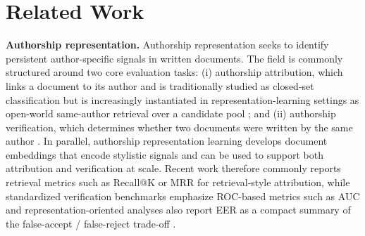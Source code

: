 \documentclass{article}
\newcommand{\rev}[1]{#1}
\begin{document}
\section{Related Work}
\label{sec:related-work}
\textbf{Authorship representation.} 
Authorship representation \cite{huang2025authorship,habib2025trends,tyo2022state} seeks to identify persistent author-specific signals in written documents. The field is commonly structured around two core evaluation tasks: (i) authorship attribution, which links a document to its author \rev{and is traditionally studied as closed-set classification \citep{stamatatos2009survey,neal2017surveying} but is increasingly instantiated in representation-learning settings as open-world same-author retrieval over a candidate pool \citep{riverasoto2021luar,wang2023canrep}}; and (ii) authorship verification, which determines whether two documents were written by the same author \citep{neal2017surveying,pan2022av}. In parallel, authorship representation learning develops document embeddings that encode stylistic signals and can be used to support both attribution and verification at scale. \rev{Recent work therefore commonly reports retrieval metrics such as Recall@K or MRR for retrieval-style attribution, while standardized verification benchmarks emphasize ROC-based metrics such as AUC and representation-oriented analyses also report EER as a compact summary of the false-accept / false-reject trade-off \citep{pan2022av,pan2023av,wang2023canrep}.}
\end{document}
